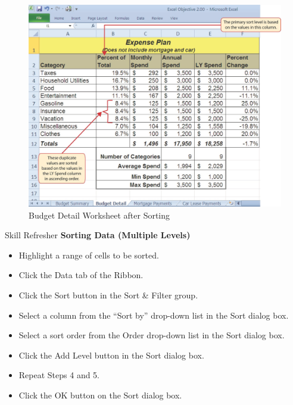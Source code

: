 \begin{figure}[H]
	\centering
	\includegraphics[width=\maxwidth{.95\linewidth}]{gfx/ch02_fig28}
	\caption{Budget Detail Worksheet after Sorting}
	\label{02:fig28}
\end{figure}

\begin{center}
	\begin{sklbox}{Skill Refresher}
		\textbf{Sorting Data (Multiple Levels)}
		\\
		\begin{itemize}
			\setlength{\itemsep}{0pt}
			\setlength{\parskip}{0pt}
			\setlength{\parsep}{0pt}
			
			\item Highlight a range of cells to be sorted.
			\item Click the Data tab of the Ribbon.
			\item Click the Sort button in the Sort \& Filter group.
			\item Select a column from the ``Sort by'' drop-down list in the Sort dialog box.
			\item Select a sort order from the Order drop-down list in the Sort dialog box.
			\item Click the Add Level button in the Sort dialog box.
			\item Repeat Steps 4 and 5.
			\item Click the OK button on the Sort dialog box.
			
		\end{itemize}
	\end{sklbox}
\end{center}

